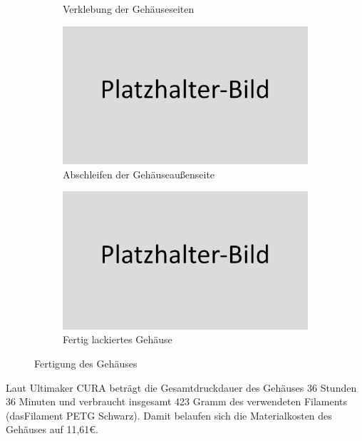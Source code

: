 \begin{figure}[h!tb]
\begin{subfigure}[b]{0.5\linewidth}
		\caption[Verklebung der Gehäuseseiten]{Verklebung der Gehäuseseiten}
	\label{fig:glued_parts_02}
	\end{subfigure}
	\begin{subfigure}[b]{0.5\linewidth}
		\centering
		\includegraphics[width=1\textwidth]{img/placeholder.png}
		\caption[Abschleifen der Gehäuseaußenseite]{Abschleifen der Gehäuseaußenseite}
		\label{fig:filed_parts}
	\end{subfigure}
	\begin{subfigure}[b]{0.5\linewidth}
		\centering
		\includegraphics[width=1\textwidth]{img/placeholder.png}
		\caption[Fertig lackiertes Gehäuse]{Fertig lackiertes Gehäuse}
		\label{fig:finished_parts}
	\end{subfigure}
	\caption[Fertigung des Gehäuses]{Fertigung des Gehäuses}
	\label{fig:creating-case}
\end{figure}
Laut Ultimaker CURA beträgt die Gesamtdruckdauer des Gehäuses 36 Stunden 36 Minuten und verbraucht insgesamt 423 Gramm des verwendeten Filaments (dasFilament PETG Schwarz). Damit belaufen sich die Materialkosten des Gehäuses auf 11,61\euro{}.
\newpage
